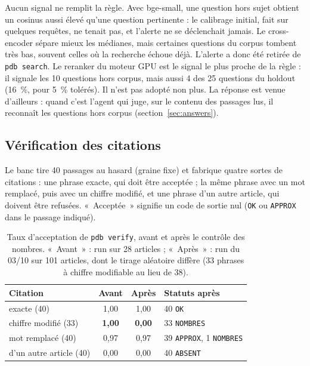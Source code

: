 \documentclass[11pt,a4paper]{article}
\newcommand{\cmd}[1]{\texttt{#1}}
\begin{document}
Aucun signal ne remplit la règle. Avec bge-small, une question hors sujet obtient un
cosinus aussi élevé qu'une question pertinente : le calibrage initial, fait sur quelques
requêtes, ne tenait pas, et l'alerte ne se déclenchait jamais. Le cross-encoder sépare mieux
les médianes, mais certaines questions du corpus tombent très bas, souvent celles où la
recherche échoue déjà. L'alerte a donc été retirée de \cmd{pdb search}. Le reranker du
moteur GPU est le signal le plus proche de la règle : il signale les 10 questions hors
corpus, mais aussi 4 des 25 questions du holdout (16~\%, pour 5~\% tolérés). Il n'est pas
adopté non plus. La réponse est venue d'ailleurs : quand c'est l'agent qui juge, sur le
contenu des passages lus, il reconnaît les questions hors corpus
(section~\ref{sec:answers}).

\subsection{Vérification des citations}
\label{sec:evalverify}

Le banc tire 40 passages au hasard (graine fixe) et fabrique quatre sortes de citations :
une phrase exacte, qui doit être acceptée ; la même phrase avec un mot remplacé, puis avec
un chiffre modifié, et une phrase d'un autre article, qui doivent être refusées.
«~Acceptée~» signifie un code de sortie nul (\cmd{OK} ou \cmd{APPROX} dans le passage
indiqué).

\begin{table}[ht]
\centering
\caption{Taux d'acceptation de \cmd{pdb verify}, avant et après le contrôle des nombres. «~Avant~» :
run sur 28 articles ; «~Après~» : run du 03/10 sur 101 articles, dont le tirage aléatoire
diffère (33 phrases à chiffre modifiable au lieu de 38).}
\label{tab:verify}
\small
\begin{tabular}{@{}lccl@{}}
\toprule
Citation & Avant & Après & Statuts après \\
\midrule
exacte (40)            & 1,00 & 1,00 & 40 \cmd{OK} \\
chiffre modifié (33)   & \textbf{1,00} & \textbf{0,00} & 33 \cmd{NOMBRES} \\
mot remplacé (40)      & 0,97 & 0,97 & 39 \cmd{APPROX}, 1 \cmd{NOMBRES} \\
d'un autre article (40) & 0,00 & 0,00 & 40 \cmd{ABSENT} \\
\bottomrule
\end{tabular}
\end{table}
\end{document}
